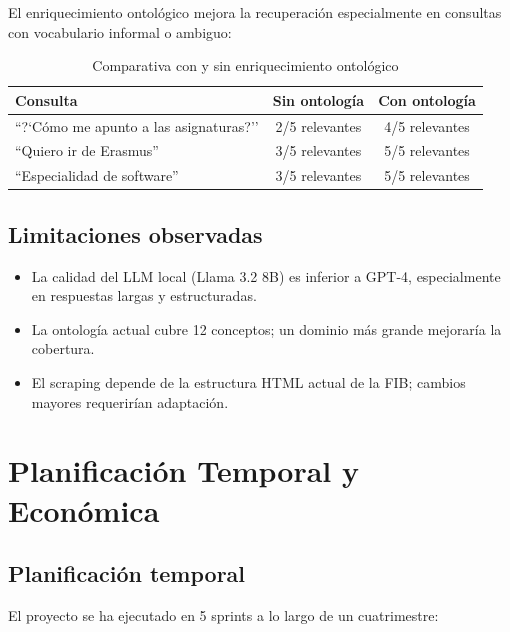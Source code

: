 \documentclass[12pt, a4paper, twoside]{report}
\begin{document}
El enriquecimiento ontol\'ogico mejora la recuperaci\'on especialmente en consultas con vocabulario informal o ambiguo:

\begin{table}[H]
\centering
\caption{Comparativa con y sin enriquecimiento ontol\'ogico}
\label{tab:ontology-impact}
\begin{tabularx}{\textwidth}{Xcc}
\toprule
\textbf{Consulta} & \textbf{Sin ontolog\'ia} & \textbf{Con ontolog\'ia} \\
\midrule
``?`C\'omo me apunto a las asignaturas?'' & 2/5 relevantes & 4/5 relevantes \\
``Quiero ir de Erasmus'' & 3/5 relevantes & 5/5 relevantes \\
``Especialidad de software'' & 3/5 relevantes & 5/5 relevantes \\
\bottomrule
\end{tabularx}
\end{table}

\section{Limitaciones observadas}

\begin{itemize}
  \item La calidad del LLM local (Llama 3.2 8B) es inferior a GPT-4, especialmente en respuestas largas y estructuradas.
  \item La ontolog\'ia actual cubre 12 conceptos; un dominio m\'as grande mejorar\'ia la cobertura.
  \item El scraping depende de la estructura HTML actual de la FIB; cambios mayores requerir\'ian adaptaci\'on.
\end{itemize}


\chapter{Planificaci\'on Temporal y Econ\'omica}
\label{ch:planificacion}

\section{Planificaci\'on temporal}

El proyecto se ha ejecutado en 5 sprints a lo largo de un cuatrimestre:
\end{document}
